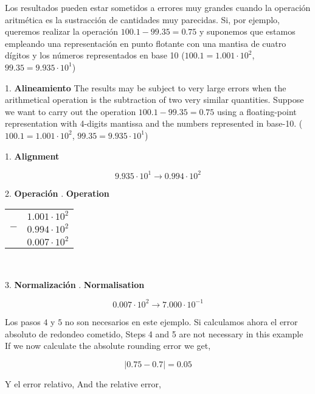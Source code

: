 \begin{paracol}{2}
Los resultados pueden estar sometidos a errores muy grandes cuando la operación aritmética es la sustracción de cantidades muy parecidas. Si, por ejemplo, queremos realizar la operación $100.1-99.35=0.75$ y suponemos que estamos empleando una representación en punto flotante con una mantisa de cuatro dígitos y los números representados en base 10 ($100.1=1.001\cdot10^2$, $99.35=9.935\cdot 10^1$) 

 1. \textbf{Alineamiento}
 \switchcolumn
 The results may be subject to very large errors when the arithmetical operation is the subtraction of two very similar quantities. Suppose we want to carry out the operation $100.1-99.35=0.75$  using a floating-point representation with 4-digits mantissa and the numbers represented in base-10. ($100.1=1.001\cdot10^2$, $99.35=9.935\cdot 10^1$) 

1. \textbf{Alignment} 
\end{paracol}
 
\begin{equation*}
9.935\cdot 10^1\rightarrow 0.994 \cdot 10^2
\end{equation*}

\begin{paracol}{2}
2. \textbf{Operación}
. \textbf{Operation}
\end{paracol}
\begin{minipage}{\textwidth}
	\centering
\begin{tabular}{c r}
&$1.001\cdot10^2$\\
$-$&$0.994\cdot10^2$\\
\hline
&$0.007\cdot10^2$
\end{tabular}\\
\end{minipage}
\begin{paracol}{2}
3. \textbf{Normalización}
. \textbf{Normalisation}
\end{paracol}
\begin{equation*}
0.007\cdot10^2\rightarrow 7.000\cdot10^{-1}
\end{equation*}

\begin{paracol}{2}
Los pasos $4$ y $5$ no son necesarios en este ejemplo. Si calculamos ahora el error absoluto de redondeo cometido,
\switchcolumn
Steps 4 and 5 are not necessary in this example If we now calculate the absolute rounding error we get, 
\end{paracol}
\begin{equation*}
\vert 0.75-0.7 \vert =0.05
\end{equation*} 
\begin{paracol}{2}
Y el error relativo,
\switchcolumn
And the relative error,
\end{paracol}

